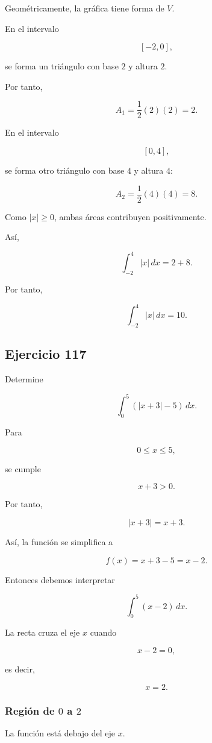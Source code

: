 \documentclass[12pt]{article}
\begin{document}
Geométricamente, la gráfica tiene forma de \(V\).

En el intervalo

\[
[-2,0],
\]

se forma un triángulo con base \(2\) y altura \(2\).

Por tanto,

\[
A_1
=
\frac12(2)(2)
=
2.
\]

En el intervalo

\[
[0,4],
\]

se forma otro triángulo con base \(4\) y altura \(4\):

\[
A_2
=
\frac12(4)(4)
=
8.
\]

Como \(|x|\geq0\), ambas áreas contribuyen positivamente.

Así,

\[
\int_{-2}^{4}|x|\,dx
=
2+8.
\]

Por tanto,

\[
\boxed{
\int_{-2}^{4}|x|\,dx=10
}.
\]

\subsection*{Ejercicio 117}

Determine

\[
\int_{0}^{5}(|x+3|-5)\,dx.
\]

Para

\[
0\leq x\leq5,
\]

se cumple

\[
x+3>0.
\]

Por tanto,

\[
|x+3|=x+3.
\]

Así, la función se simplifica a

\[
f(x)=x+3-5=x-2.
\]

Entonces debemos interpretar

\[
\int_0^5(x-2)\,dx.
\]

La recta cruza el eje \(x\) cuando

\[
x-2=0,
\]

es decir,

\[
x=2.
\]

\subsubsection*{Región de \(0\) a \(2\)}

La función está debajo del eje \(x\).
\end{document}
